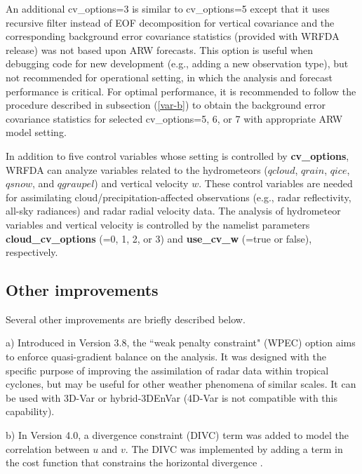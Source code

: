 An additional cv\_options=3 is similar to cv\_options=5 except that it uses recursive filter instead of EOF decomposition
for vertical covariance and the corresponding background error covariance statistics (provided with WRFDA release) 
was not based upon ARW forecasts.
This option is useful when debugging code for new development (e.g., adding a new observation type), but not recommended 
for operational setting, in which the analysis and forecast performance is critical.
For optimal performance, it is recommended to follow the procedure described in subsection (\ref{var-b}) to
obtain the background error covariance statistics for selected cv\_options=5, 6, or 7 with appropriate ARW model setting.

In addition to five control variables whose setting is controlled by {\bf cv\_options}, WRFDA can analyze variables related
to the hydrometeors ($qcloud$, $qrain$, $qice$, $qsnow$, and $qgraupel$) and vertical velocity $w$. These control variables
are needed for assimilating cloud/precipitation-affected observations (e.g., radar reflectivity, all-sky radiances) and 
radar radial velocity data. The analysis of hydrometeor variables and vertical velocity is controlled by the namelist parameters
{\bf cloud\_cv\_options} (=0, 1, 2, or 3) and {\bf use\_cv\_w} (=true or false), respectively.

\subsection{Other improvements}

Several other improvements are briefly described below.

\vspace{0.5cm}

a) Introduced in Version 3.8, the ``weak penalty constraint" (WPEC) option \citep{li15} aims to enforce quasi-gradient balance on the analysis. 
It was designed with the specific purpose of improving the assimilation of radar data within tropical cyclones, but may be useful 
for other weather phenomena of similar scales. It can be used with 3D-Var or hybrid-3DEnVar (4D-Var is not compatible with this capability).

\vspace{0.5cm}

b) In Version 4.0, a divergence constraint (DIVC) term was added to model the correlation between $u$ and $v$. The DIVC was implemented by adding a term in the cost function that constrains the horizontal divergence \citep{tong16}. 

